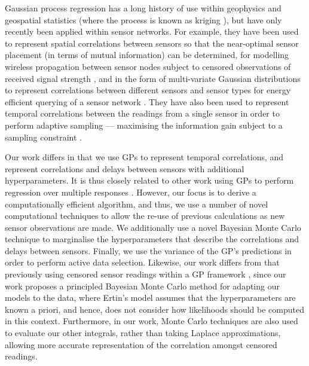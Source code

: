 \documentclass{acmtrans2m}
\begin{document}
\noindent Gaussian process regression has a long history of use within geophysics and geospatial statistics (where the process is known as kriging \cite{cressie}), but have only recently been applied within sensor networks. For example, they have been used to represent spatial correlations between sensors so that the near-optimal sensor placement (in terms of mutual information) can be determined, for modelling wireless propagation between sensor nodes subject to censored observations of received signal strength \cite{ertin2007gpm}, and in the form of multi-variate Gaussian distributions to represent correlations between different sensors and sensor types for energy efficient querying of a sensor network \cite{guestrin2}. They have also been used to represent temporal correlations between the readings from a single sensor in order to perform adaptive sampling --- maximising the information gain subject to a sampling constraint \cite{1525857}.

Our work differs in that we use GPs to represent temporal correlations, and represent correlations and delays between sensors with additional hyperparameters. It is thus closely related to other work using GPs to perform regression over multiple responses \cite{dep_GP,latent_factor}. However, our focus is to derive a computationally efficient algorithm, and thus, we use a number of novel computational techniques to allow the re-use of previous calculations as new sensor observations are made. We additionally use a novel Bayesian Monte Carlo technique to marginalise the hyperparameters that describe the correlations and delays between sensors. Finally, we use the variance of the GP's predictions in order to perform active data selection. Likewise, our work differs from that previously using censored sensor readings within a GP framework \cite{ertin2007gpm}, since our work proposes a principled Bayesian Monte Carlo method for adapting our models to the data, where Ertin's model assumes that the hyperparameters are known a priori, and hence, does not consider how likelihoods should be computed in this context. Furthermore, in our work, Monte Carlo techniques are also used to evaluate our other integrals, rather than taking Laplace approximations, allowing more accurate representation of the correlation amongst censored readings. 
\end{document}
